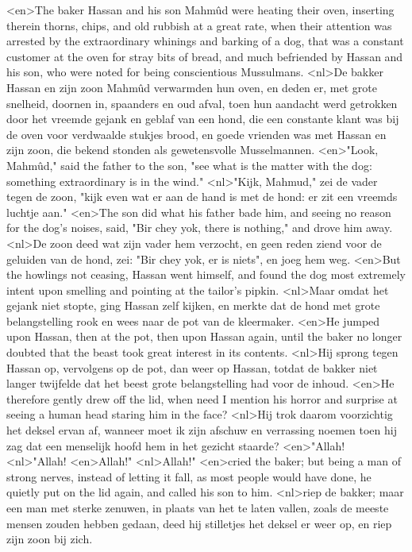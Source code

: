 <en>The baker Hassan and his son Mahmûd were heating their oven, inserting therein thorns, chips, and old rubbish at a great rate, when their attention was arrested by the extraordinary whinings and barking of a dog, that was a constant customer at the oven for stray bits of bread, and much befriended by Hassan and his son, who were noted for being conscientious Mussulmans.
<nl>De bakker Hassan en zijn zoon Mahmûd verwarmden hun oven, en deden er,  met grote snelheid, doornen in, spaanders en oud afval, toen hun aandacht werd getrokken door het vreemde gejank en geblaf van een hond, die een constante klant was bij de oven voor verdwaalde stukjes brood, en goede vrienden was met Hassan en zijn zoon, die bekend stonden als gewetensvolle Musselmannen.
<en>"Look, Mahmûd," said the father to the son, "see what is the matter with the dog: something extraordinary is in the wind."
<nl>"Kijk, Mahmud," zei de vader tegen de zoon, "kijk even wat er aan de hand is met de hond: er zit een vreemds luchtje aan."
<en>The son did what his father bade him, and seeing no reason for the dog's noises, said, "Bir chey yok, there is nothing," and drove him away.
<nl>De zoon deed wat zijn vader hem verzocht, en geen reden ziend voor de geluiden van de hond, zei: "Bir chey yok, er is niets", en joeg hem weg.
<en>But the howlings not ceasing, Hassan went himself, and found the dog most extremely intent upon smelling and pointing at the tailor's pipkin.
<nl>Maar omdat het gejank niet stopte, ging Hassan zelf kijken, en merkte dat de hond met grote belangstelling rook en wees naar de pot van de kleermaker.
<en>He jumped upon Hassan, then at the pot, then upon Hassan again, until the baker no longer doubted that the beast took great interest in its contents.
<nl>Hij sprong tegen Hassan op, vervolgens op de pot, dan weer op Hassan, totdat de bakker  niet langer twijfelde dat het beest grote belangstelling had voor de inhoud.
<en>He therefore gently drew off the lid, when need I mention his horror and surprise at seeing a human head staring him in the face?
<nl>Hij trok daarom voorzichtig het deksel ervan af, wanneer moet ik zijn afschuw en verrassing noemen toen hij zag dat een menselijk hoofd hem in het gezicht staarde?
<en>"Allah!
<nl>"Allah!
<en>Allah!"
<nl>Allah!"
<en>cried the baker; but being a man of strong nerves, instead of letting it fall, as most people would have done, he quietly put on the lid again, and called his son to him.
<nl>riep de bakker; maar een man met sterke zenuwen, in plaats van het te laten vallen, zoals de meeste mensen zouden hebben gedaan, deed hij stilletjes het deksel er weer op, en riep zijn zoon bij zich.
